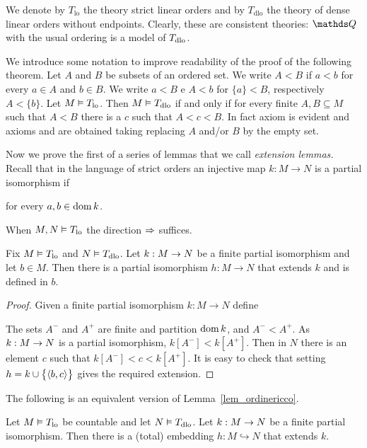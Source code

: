 We denote by \emph{$T_{\textrm{lo}}$} the theory strict linear orders and by \emph{$T_{\textrm{dlo}}$} the theory of dense linear orders without endpoints.
Clearly, these are consistent theories: $\QQ$ with the usual ordering is a model of $T_{\rm dlo}$.

We introduce some notation to improve readability of the proof of the following theorem.
Let $A$ and $B$ be subsets of an ordered set.
We write $A<B$ if $a<b$ for every $a\in A$ and $b\in B$.
We write $a<B$ e $A<b$ for $\{a\}<B$, respectively $A<\{b\}$.
Let $M\models T_{\rm lo}$.
Then $M\models T_{\rm dlo}$ if and only if for every finite $A, B\subseteq M$ such that $A<B$ there is a $c$ such that  $A<c<B$.
In fact axiom  is evident and axioms  and  are obtained taking replacing $A$ and/or $B$ by the empty set.

Now we prove the first of a series of lemmas that we call \emph{extension lemmas.}
Recall that in the language of strict orders an injective map $k:M\to N$ is a partial isomorphism if 

\hfill for every $a,b\in\dom k$.

When $M,N\models T_{\rm lo}$ the direction $\IMP$ suffices.

\begin{lemma}\label{lem_ordinericco}
Fix $M\models T_{\rm lo}$ and $N\models T_{\rm dlo}$.
Let $k:M\imp N$ be a finite partial isomorphism and let $b\in M$.
Then there is a partial isomorphism $h:M\to N$ that extends $k$ and is defined in $b$.
\end{lemma}

\begin{proof}
Given a finite partial isomorphism $k:M\to N$ define



The sets $A^-$ and $A^+$ are finite and partition $\dom k$, and  $A^-<A^+$.
As $k:M\imp N$ is a partial isomorphism, $k[A^-]<k[A^+]$.
Then in $N$ there is an element $c$ such that $k[A^-]<c<k[A^+]$.
It is easy to check that setting $h=k\cup\big\{\<b,c\>\big\}$ gives the required extension.
\end{proof}

The following is an equivalent version of Lemma~\ref{lem_ordinericco}.

\begin{corollary}\label{coroll_ordinericco}
Let $M\models T_{\rm lo}$ be countable and let $N\models T_{\rm dlo}$.
Let $k:M\imp N$ be a finite partial isomorphism.
Then there is a (total) embedding $h:M\hookrightarrow N$ that extends $k$.
\end{corollary}

